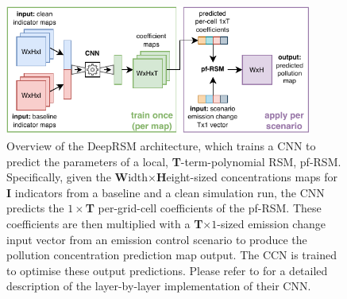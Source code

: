 \begin{figure}[H]
    \centering
    \includegraphics[width=0.9\textwidth]{background/figures/deep-rsm.pdf}
    \caption[Overview of the DeepRSM architecture]{Overview of the DeepRSM architecture, which trains a CNN to predict the parameters of a local, \textbf{T}-term-polynomial RSM, pf-RSM. Specifically, given the \textbf{W}idth$\times$\textbf{H}eight-sized concentrations maps for \textbf{I} indicators from a baseline and a clean simulation run, the CNN predicts the $1 \times$\textbf{T} per-grid-cell coefficients of the pf-RSM. These coefficients are then multiplied with a \textbf{T}$\times 1$-sized emission change input vector from an emission control scenario to produce the pollution concentration prediction map output. The CCN is trained to optimise these output predictions. Please refer to \textcite{deep-rsm-2020} for a detailed description of the layer-by-layer implementation of their CNN.}
    \label{fig:deep-rsm}
\end{figure}

